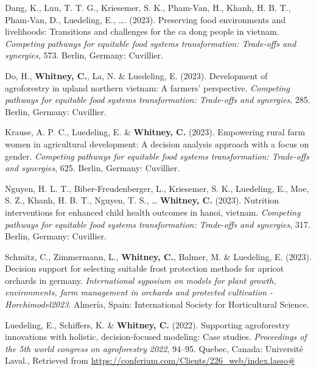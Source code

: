 \documentclass[11pt,a4paper,]{awesome-cv}
\newlength{\cslhangindent}
\newenvironment{CSLReferences}[2] %
 {\begin{list}{}{%
  \setlength{\itemindent}{0pt}
  \setlength{\leftmargin}{0pt}
  \setlength{\parsep}{0pt}
  \ifodd #1
   \setlength{\leftmargin}{\cslhangindent}
   \setlength{\itemindent}{-1\cslhangindent}
  \fi
  \setlength{\itemsep}{#2\baselineskip}}}
 {\end{list}}
\begin{document}
\label{refs-c39022b7c6b2fb48b18f526cfa8385ee}
\begin{CSLReferences}{1}{0}
Dang, K., Luu, T. T. G., Kriesemer, S. K., Pham-Van, H., Khanh, H. B.
T., Pham-Van, D., Luedeling, E., \ldots{}. (2023). Preserving food
environments and livelihoods: Transitions and challenges for the ca dong
people in vietnam. \emph{Competing pathways for equitable food systems
transformation: Trade-offs and synergies}, 573. Berlin, Germany:
Cuvillier.

Do, H., \textbf{Whitney, C.}, La, N. \& Luedeling, E. (2023).
Development of agroforestry in upland northern vietnam: A farmers'
perspective. \emph{Competing pathways for equitable food systems
transformation: Trade-offs and synergies}, 285. Berlin, Germany:
Cuvillier.

Krause, A. P. C., Luedeling, E. \& \textbf{Whitney, C.} (2023).
Empowering rural farm women in agricultural development: A decision
analysis approach with a focus on gender. \emph{Competing pathways for
equitable food systems transformation: Trade-offs and synergies}, 625.
Berlin, Germany: Cuvillier.

Nguyen, H. L. T., Biber-Freudenberger, L., Kriesemer, S. K., Luedeling,
E., Moe, S. Z., Khanh, H. B. T., Nguyen, T. S., \ldots{}
\textbf{Whitney, C.} (2023). Nutrition interventions for enhanced child
health outcomes in hanoi, vietnam. \emph{Competing pathways for
equitable food systems transformation: Trade-offs and synergies}, 317.
Berlin, Germany: Cuvillier.

Schmitz, C., Zimmermann, L., \textbf{Whitney, C.}, Balmer, M. \&
Luedeling, E. (2023). Decision support for selecting suitable frost
protection methods for apricot orchards in germany. \emph{International
syposium on models for plant growth, environments, farm management in
orchards and protected cultivation - Horchimodel2023}. Almería, Spain:
International Society for Horticultural Science.

Luedeling, E., Schiffers, K. \& \textbf{Whitney, C.} (2022). Supporting
agroforestry innovations with holistic, decision-focused modeling: Case
studies. \emph{Proceedings of the 5th world congress on agroforestry
2022}, 94--95. Quebec, Canada: Université Laval., Retrieved from
\url{https://conferium.com/Clients/226_web/index.lasso\#}


\end{CSLReferences}
\end{document}
